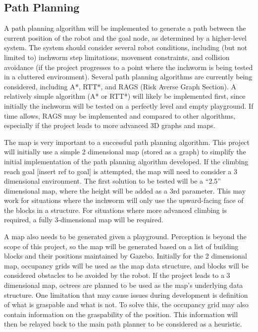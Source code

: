 \subsection{Path Planning}
A path planning algorithm will be implemented to generate a path between the current position of the robot and the goal node, as determined by a higher-level system. The system should consider several robot conditions, including (but not limited to) inchworm step limitations, movement constraints, and collision avoidance \cite{CollisionAvoidance} (if the project progresses to a point where the inchworm is being tested in a cluttered environment). Several path planning algorithms are currently being considered, including A*, RTT*\cite{RT_RTT}, and RAGS (Risk Averse Graph Section). A relatively simple algorithm (A* or RTT*) will likely be implemented first, since initially the inchworm will be tested on a perfectly level and empty playground. If time allows, RAGS \cite{RAGS} may be implemented and compared to other algorithms, especially if the project leads to more advanced 3D graphs and maps.

The map is very important to a successful path planning algorithm. This project will initially use a simple 2 dimensional map (stored as a graph) to simplify the initial implementation of the path planning algorithm developed. If the climbing reach goal [insert ref to goal] is attempted, the map will need to consider a 3 dimensional environment. The first solution to be tested will be a “2.5” dimensional map, where the height will be added as a 3rd parameter. This may work for situations where the inchworm will only use the upward-facing face of the blocks in a structure. For situations where more advanced climbing is required, a fully 3-dimensional map will be required.

A map also needs to be generated given a playground. Perception is beyond the scope of this project, so the map will be generated based on a list of building blocks and their positions maintained by Gazebo. Initially for the 2 dimensional map, occupancy grids will be used as the map data structure, and blocks will be considered obstacles to be avoided by the robot. If the project leads to a 3 dimensional map, octrees are planned to be used as the map’s underlying data structure. One limitation that may cause issues during development is definition of what is graspable and what is not. To solve this, the occupancy grid may also contain information on the graspability of the position. This information will then be relayed back to the main path planner to be considered as a heuristic.

